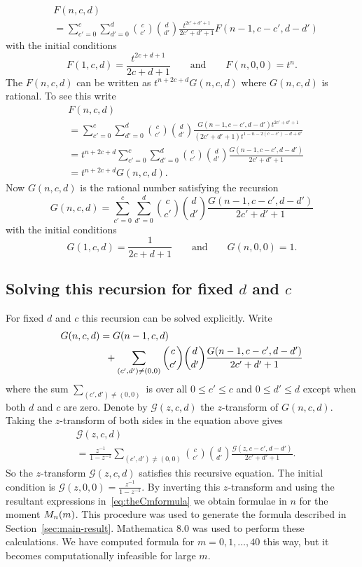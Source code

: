 \documentclass[journal]{IEEEtran}
\begin{document}
\begin{align*}
&F(n,c,d) \\
&= \sum_{c'=0}^{c} \sum_{d'=0}^{d} \binom{c}{c'}\binom{d}{d'} \frac{t^{2c'+d'+1}}{2c'+d'+1}F(n-1,c-c',d-d')
\end{align*}
with the initial conditions
\[
F(1,c,d) = \frac{t^{2c+d+1}}{2c+d+1} \qquad \text{and} \qquad F(n,0,0) = t^n.
\]
The $F(n,c,d)$ can be written as $t^{n+2c+d}G(n,c,d)$ where $G(n,c,d)$ is rational.  To see this write
\begin{align*}
&F(n,c,d) \\
&=  \sum_{c'=0}^{c} \sum_{d'=0}^{d} \binom{c}{c'}\binom{d}{d'} \frac{G(n-1,c-c',d-d') t^{2c'+d'+1}}{(2c'+d'+1) t^{1-n-2(c-c')-d+d'}} \\
&=  t^{n+2c+d}\sum_{c'=0}^{c} \sum_{d'=0}^{d} \binom{c}{c'}\binom{d}{d'} \frac{G(n-1,c-c',d-d')}{2c'+d'+1} \\
&=  t^{n+2c+d}G(n,c,d).
\end{align*}
Now $G(n,c,d)$ is the rational number satisfying the recursion
\[
G(n,c,d) = \sum_{c'=0}^{c} \sum_{d'=0}^{d} \binom{c}{c'}\binom{d}{d'} \frac{G(n-1,c-c',d-d')}{2c'+d'+1}
\]
with the initial conditions
\[
G(1,c,d) = \frac{1}{2c+d+1} \qquad \text{and} \qquad G(n,0,0) = 1.
\]

\subsection{Solving this recursion for fixed $d$ and $c$}\label{sec:solv-this-recurs}
\newcommand{\calG}{\mathcal G}

For fixed $d$ and $c$ this recursion can be solved explicitly.  Write
\begin{align*}
G(n,c,d) &= G(n-1,c,d) \\
&\hspace{0.2cm}+ \sum_{ (c',d') \neq (0,0)} \binom{c}{c'}\binom{d}{d'} \frac{G(n-1,c-c',d-d')}{2c'+d'+1}
\end{align*}
where the sum $\sum_{ (c',d') \neq (0,0)}$ is over all $0 \leq c' \leq c$ and $0 \leq d' \leq d$ except when both $d$ and $c$ are zero.  Denote by $\calG(z,c,d)$ the $z$-transform of $G(n,c,d)$.  Taking the $z$-transform of both sides in the equation above gives
\begin{align*}
&\calG(z,c,d) \\
&= \frac{z^{-1}}{1-z^{-1}} \sum_{ (c',d') \neq (0,0)} \binom{c}{c'}\binom{d}{d'} \frac{\calG(z,c-c',d-d')}{2c'+d'+1}.
\end{align*}
So the $z$-transform $\calG(z,c,d)$ satisfies this recursive equation.  The initial condition is $\calG(z,0,0) = \frac{z^{-1}}{1 - z^{-1}}$.  By inverting this $z$-transform and using the resultant expressions in~\eqref{eq:theCmformula} we obtain formulae in $n$ for the moment $M_n(m)$.  This procedure was used to generate the formula described in Section~\ref{sec:main-result}.  Mathematica 8.0 was used to perform these calculations.  We have computed formula for $m = 0, 1, \dots, 40$ this way, but it becomes computationally infeasible for large $m$.
\end{document}
